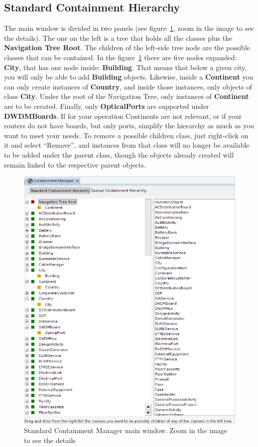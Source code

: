 \documentclass[a4paper]{article}
\begin{document}
	\subsection{Standard Containment Hierarchy} \label{sec:standard_containment_hierarchy}
	The main window is divided in two panels (see figure~\ref{fig:standard_containment_manager}, zoom in the image to see the details). The one on the left is a tree that holds all the classes plus the \textbf{Navigation Tree Root}. The children of the left-side tree node are the possible classes that can be contained. In the figure~\ref{fig:standard_containment_manager} there are five nodes expanded: \textbf{City}, that has one node inside: \textbf{Building}. That means that below a given city, you will only be able to add \textbf{Building} objects. Likewise, inside a \textbf{Continent} you can only create instances of \textbf{Country}, and inside those instances, only objects of class \textbf{City}. Under the root of the Navigation Tree, only instances of \textbf{Continent} are to be created. Finally, only \textbf{OpticalPorts} are supported under \textbf{DWDMBoards}. If for your operation Continents are not relevant, or if your routers do not have boards, but only ports, simplify the hierarchy as much as you want to meet your needs. To remove a possible children class, just right-click on it and select “Remove”, and instances from that class will no longer be available to be added under the parent class, though the objects already created will remain linked to the respective parent objects.
	
	\begin{figure}[h!]
		\centering
		\includegraphics[width=0.8\linewidth]{img/standard_containment_manager.png}
		\caption{Standard Containment Manager main window. Zoom in the image to see the details}
		\label{fig:standard_containment_manager}
	\end{figure}
	
\end{document}
